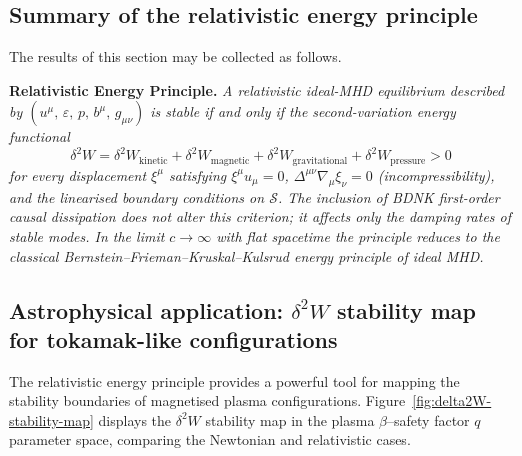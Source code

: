 \subsection{Summary of the relativistic energy
  principle}\label{sec:rel-122-summary}

The results of this section may be collected as follows.

\medskip\noindent
\textbf{Relativistic Energy Principle.}
\emph{A relativistic ideal-MHD equilibrium described by
$(u^{\mu},\,\varepsilon,\,p,\,b^{\mu},\,g_{\mu\nu})$ is stable if
and only if the second-variation energy functional
\begin{equation}
  \delta^{2}W
  = \delta^{2}W_{\mathrm{kinetic}}
  + \delta^{2}W_{\mathrm{magnetic}}
  + \delta^{2}W_{\mathrm{gravitational}}
  + \delta^{2}W_{\mathrm{pressure}}
  > 0
  \label{eq:rel14-principle-summary}
\end{equation}
for every displacement $\xi^{\mu}$ satisfying
$\xi^{\mu}u_{\mu}=0$, $\Delta^{\mu\nu}\nabla_{\mu}\xi_{\nu}=0$
(incompressibility), and the linearised boundary conditions
on $\mathcal{S}$.  The inclusion of BDNK first-order causal dissipation
does not alter this criterion; it affects only the damping rates of
stable modes.  In the limit $c\to\infty$ with flat spacetime the
principle reduces to the classical Bernstein--Frieman--Kruskal--Kulsrud
energy principle of ideal MHD.}

\subsection{Astrophysical application: $\delta^{2}W$ stability map
  for tokamak-like configurations}\label{sec:rel-122-astro}

The relativistic energy principle provides a powerful tool for mapping
the stability boundaries of magnetised plasma configurations.
Figure~\ref{fig:delta2W-stability-map} displays the $\delta^{2}W$
stability map in the plasma $\beta$--safety factor $q$ parameter
space, comparing the Newtonian and relativistic cases.

